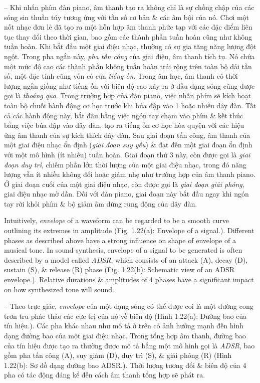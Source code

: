\documentclass{article}
\begin{document}
\begin{itemize}
\begin{itemize}
\begin{itemize}
			-- Khi nhấn phím đàn piano, âm thanh tạo ra không chỉ là sự chồng chập của các sóng sin thuần túy tương ứng với tần số cơ bản \& các âm bội của nó. Chơi một nốt nhạc đơn lẻ đã tạo ra một hỗn hợp âm thanh phức tạp với các đặc điểm liên tục thay đổi theo thời gian, bao gồm các thành phần tuần hoàn cũng như không tuần hoàn. Khi bắt đầu một giai điệu nhạc, thường có sự gia tăng năng lượng đột ngột. Trong pha ngắn này, {\it pha tấn công} của giai điệu, âm thanh tích tụ. Nó chứa một mức độ cao các thành phần không tuần hoàn trải rộng trên toàn bộ dải tần số, một đặc tính cũng vốn có của {\it tiếng ồn}. Trong âm học, âm thanh có thời lượng ngắn giống như tiếng ồn với biên độ cao xảy ra ở đầu dạng sóng cũng được gọi là {\it thoáng qua}. Trong trường hợp của đàn piano, việc nhấn phím sẽ kích hoạt toàn bộ chuỗi hành động cơ học trước khi búa đập vào 1 hoặc nhiều dây đàn. Tất cả các hành động này, bắt đầu bằng việc ngón tay chạm vào phím \& kết thúc bằng việc búa đập vào dây đàn, tạo ra tiếng ồn cơ học hòa quyện với các hiệu ứng âm thanh của sự kích thích dây đàn. Sau giai đoạn tấn công, âm thanh của một giai điệu nhạc ổn định ({\it giai đoạn suy yếu}) \& đạt đến một giai đoạn ổn định với một mô hình (ít nhiều) tuần hoàn. Giai đoạn thứ 3 này, còn được gọi là {\it giai đoạn duy trì}, chiếm phần lớn thời lượng của một giai điệu nhạc, trong đó năng lượng vẫn ít nhiều không đổi hoặc giảm nhẹ như trường hợp của âm thanh piano. Ở giai đoạn cuối của một giai điệu nhạc, còn được gọi là {\it giai đoạn giải phóng}, giai điệu nhạc mờ dần. Đối với đàn piano, giai đoạn này bắt đầu ngay khi ngón tay rời khỏi phím \& bộ giảm âm dừng rung động của dây đàn.
			
			Intuitively, {\it envelope} of a waveform can be regarded to be a smooth curve outlining its extremes in amplitude ({\sf Fig. 1.22(a): Envelope of a signal.}). Different phases as described above have a strong influence on shape of envelope of a musical tone. In sound synthesis, envelope of a signal to be generated is often described by a model called {\it ADSR}, which consists of an attack (A), decay (D), sustain (S), \& release (R) phase ({\sf Fig. 1.22(b): Schematic view of an ADSR envelope.}). Relative durations \& amplitudes of 4 phases have a significant impact on how synthesized tone will sound.
			
			-- Theo trực giác, {\it envelope} của một dạng sóng có thể được coi là một đường cong trơn tru phác thảo các cực trị của nó về biên độ ({\sf Hình 1.22(a): Đường bao của tín hiệu.}). Các pha khác nhau như mô tả ở trên có ảnh hưởng mạnh đến hình dạng đường bao của một giai điệu nhạc. Trong tổng hợp âm thanh, đường bao của tín hiệu được tạo ra thường được mô tả bằng một mô hình gọi là {\it ADSR}, bao gồm pha tấn công (A), suy giảm (D), duy trì (S), \& giải phóng (R) ({\sf Hình 1.22(b): Sơ đồ dạng đường bao ADSR.}). Thời lượng tương đối \& biên độ của 4 pha có tác động đáng kể đến cách âm thanh tổng hợp sẽ phát ra.
			

\end{itemize}
\end{itemize}
\end{itemize}
\end{document}
